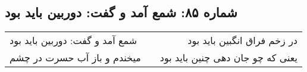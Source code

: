 \begin{center}
\section*{شماره ۸۵: شمع آمد و گفت: دوربین باید بود}
\label{sec:085}
\begin{longtable}{l p{0.5cm} r}
شمع آمد و گفت: دوربین باید بود
&&
در زخم فراق انگبین باید بود
\\
میخندم و باز آب حسرت در چشم
&&
یعنی که چو جان دهی چنین باید بود
\\
\end{longtable}
\end{center}
